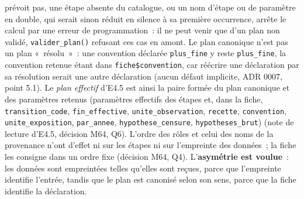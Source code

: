 \documentclass[a4paper,11pt]{article}
\newcommand{\code}[1]{\texttt{\small #1}}
\begin{document}
prévoit pas, une étape absente du catalogue, ou un nom d'étape ou de
paramètre en double, qui serait sinon réduit en silence à sa première
occurrence, arrête le calcul par une erreur de programmation~: il ne peut
venir que d'un plan non validé, \code{valider\_plan()} refusant ces cas en
amont. Le plan canonique n'est pas un plan
«~résolu~»~: une convention déclarée \code{plus\_fine} y reste
\code{plus\_fine}, la convention retenue étant dans
\code{fiche\$convention}, car réécrire une déclaration par sa résolution
serait une autre déclaration (aucun défaut implicite, ADR 0007, point 5.1).
Le \emph{plan effectif} d'E4.5 est ainsi la paire formée du plan canonique
et des paramètres retenus (paramètres effectifs des étapes et, dans la fiche,
\code{transition\_code}, \code{fin\_effective}, \code{unite\_observation},
\code{recette}, \code{convention}, \code{unite\_exposition},
\code{par\_annee}, \code{hypothese\_censure}, \code{hypotheses\_brut})
(note de lecture d'E4.5, décision M64, Q6). L'ordre des rôles et celui des
noms de la provenance n'ont d'effet ni sur les étapes ni sur l'empreinte des
données~; la fiche les consigne dans un ordre fixe (décision M64, Q4).
L'\textbf{asymétrie est voulue}~: les données sont empreintées telles
qu'elles sont reçues, parce que l'empreinte identifie l'entrée, tandis que
le plan est canonisé selon son sens, parce que la fiche identifie la
déclaration.
\end{document}
